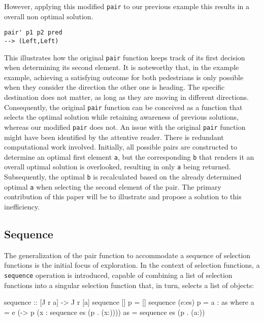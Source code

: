 \documentclass[runningheads]{llncs}
\begin{document}
However, applying this modified \texttt{pair\textquotesingle{}} to our
previous example this results in a overall non optimal solution.

\begin{verbatim}
pair' p1 p2 pred
--> (Left,Left)
\end{verbatim}

This illustrates how the original \texttt{pair} function keeps track of
its first decision when determining its second element. It is noteworthy
that, in the example example, achieving a satisfying outcome for both
pedestrians is only possible when they consider the direction the other
one is heading. The specific destination does not matter, as long as
they are moving in different directions. Consequently, the original
\texttt{pair} function can be conceived as a function that selects the
optimal solution while retaining awareness of previous solutions,
whereas our modified \texttt{pair\textquotesingle{}} does not. An issue
with the original \texttt{pair} function might have been identified by
the attentive reader. There is redundant computational work involved.
Initially, all possible pairs are constructed to determine an optimal
first element \texttt{a}, but the corresponding \texttt{b} that renders
it an overall optimal solution is overlooked, resulting in only
\texttt{a} being returned. Subsequently, the optimal \texttt{b} is
recalculated based on the already determined optimal \texttt{a} when
selecting the second element of the pair. The primary contribution of
this paper will be to illustrate and propose a solution to this
inefficiency.

\subsection{Sequence}\label{sequence}

The generalization of the pair function to accommodate a sequence of
selection functions is the initial focus of exploration. In the context
of selection functions, a \texttt{sequence} operation is introduced,
capable of combining a list of selection functions into a singular
selection function that, in turn, selects a list of objects:

\begin{code}
sequence :: [J r a] -> J r [a]
sequence [] p     = []
sequence (e:es) p = a : as
  where 
      a  = e (\x -> p (x : sequence es (p . (x:))))
      as = sequence es (p . (a:))
\end{code}
\end{document}
